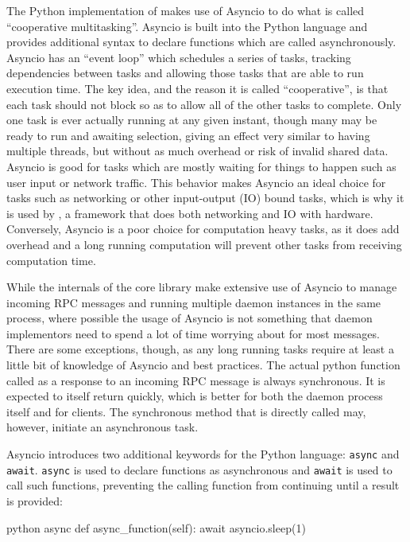The Python implementation of \yaq{} makes use of Asyncio\cite{asyncio} to do what is called ``cooperative multitasking''.
Asyncio is built into the Python language and provides additional syntax to declare functions which are called asynchronously.
Asyncio has an ``event loop'' which schedules a series of tasks, tracking dependencies between tasks and allowing those tasks that are able to run execution time.
The key idea, and the reason it is called ``cooperative'', is that each task should not block so as to allow all of the other tasks to complete.
Only one task is ever actually running at any given instant, though many may be ready to run and awaiting selection, giving an effect very similar to having multiple threads, but without as much overhead or risk of invalid shared data.
Asyncio is good for tasks which are mostly waiting for things to happen such as user input or network traffic.
This behavior makes Asyncio an ideal choice for tasks such as networking or other input-output (IO) bound tasks, which is why it is used by \yaq{}, a framework that does both networking and IO with hardware.
Conversely, Asyncio is a poor choice for computation heavy tasks, as it does add overhead and a long running computation will prevent other tasks from receiving computation time.

While the internals of the core \yaq{} library make extensive use of Asyncio to manage incoming RPC messages and running multiple daemon instances in the same process, where possible the usage of Asyncio is not something that daemon implementors need to spend a lot of time worrying about for most messages.
There are some exceptions, though, as any long running tasks require at least a little bit of knowledge of Asyncio and best practices.
The actual python function called as a response to an incoming RPC message is always synchronous.
It is expected to itself return quickly, which is better for both the daemon process itself and for clients.
The synchronous method that is directly called may, however, initiate an asynchronous task.

Asyncio introduces two additional keywords for the Python language: \texttt{async} and \texttt{await}.
\texttt{async} is used to declare functions as asynchronous and \texttt{await} is used to call such functions, preventing the calling function from continuing until a result is provided:

\begin{codefragment}{python}
    async def async_function(self):
        await asyncio.sleep(1)
\end{codefragment}

